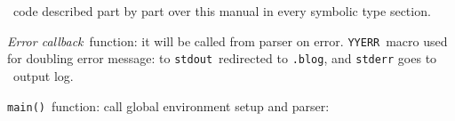 \label{cppcore}

\cpp\ code described part by part over this manual in every
symbolic type section.


\emph{Error callback}\ function: it will be called from parser on error.
\verb|YYERR|\ macro used for doubling error message: to
\verb|stdout|\ redirected to \verb|.blog|, and \verb|stderr| goes to \make\
output log.


\verb|main()|\ function: call global environment setup and parser:

